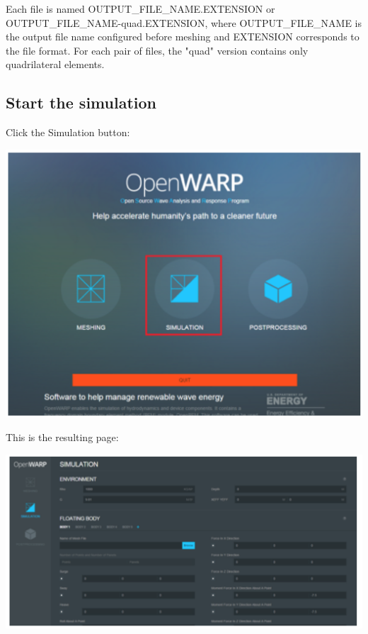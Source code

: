 \documentclass[12pt]{article}
\begin{document}
Each file is named OUTPUT_FILE_NAME.EXTENSION or OUTPUT_FILE_NAME-quad.EXTENSION, where OUTPUT_FILE_NAME is the output file name configured before meshing and EXTENSION corresponds to the file format.
For each pair of files, the "quad" version contains only quadrilateral elements.


\subsection{Start the simulation}
Click the Simulation button:

\vspace{\abovedisplayskip}
\begin{minipage}{\linewidth}
	\centering
	\includegraphics[scale=0.4]{img/25}
\end{minipage}
\vspace{\belowdisplayskip}

This is the resulting page:

\vspace{\abovedisplayskip}
\begin{minipage}{\linewidth}
	\centering
	\includegraphics[scale=0.4]{img/26}
\end{minipage}
\vspace{\belowdisplayskip}
\end{document}
